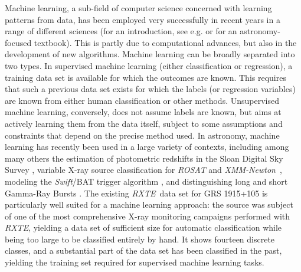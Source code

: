 \documentclass[12pt]{emulateapj}
\newcommand{\project}[1]{\textsl{#1}}
\newcommand{\rxte}{\project{RXTE}}
\newcommand{\xmm}{\project{XMM-Newton}}
\newcommand{\rosat}{\project{ROSAT}}
\newcommand{\swift}{\project{Swift}}
\begin{document}
Machine learning, a sub-field of computer science concerned with learning patterns from data, has been employed very successfully in recent years in a range of different sciences (for an introduction, see e.g. \citealt{bishop2006} or \citealt{ivezic2014} for an astronomy-focused textbook). This is partly due to computational advances, but also in the development of new algorithms. Machine learning can be broadly separated into two types. In supervised machine learning (either classification or regression), a training data set is available for which the outcomes are known. This requires that such a previous data set exists for which the labels (or regression variables) are known from either human classification or other methods. %
Unsupervised machine learning, conversely, does not assume labels are known, but aims at actively learning them from the data itself, subject to some assumptions and constraints that depend on the precise method used. In astronomy, machine learning has recently been used in a large variety of contexts, including among many others the estimation of photometric redshifts in the Sloan Digital Sky Survey \citep{carliles2010, beck2016}, variable X-ray source classification for \rosat \citep{mcglynn2004} and \xmm\ \citep{farrell2015}, modeling the \swift/BAT trigger algorithm \citep{graff2015}, and distinguishing long and short Gamma-Ray Bursts \citep{tarnopolski2015}.
The existing \rxte\ data set for GRS 1915+105 is particularly well suited for a machine learning approach: the source was subject of one of the most comprehensive X-ray monitoring campaigns performed with \rxte, yielding a data set of sufficient size for automatic classification while being too large to be classified entirely by hand. It shows fourteen discrete classes, and a substantial part of the data set has been classified in the past, yielding the training set required for supervised machine learning tasks.
\end{document}
